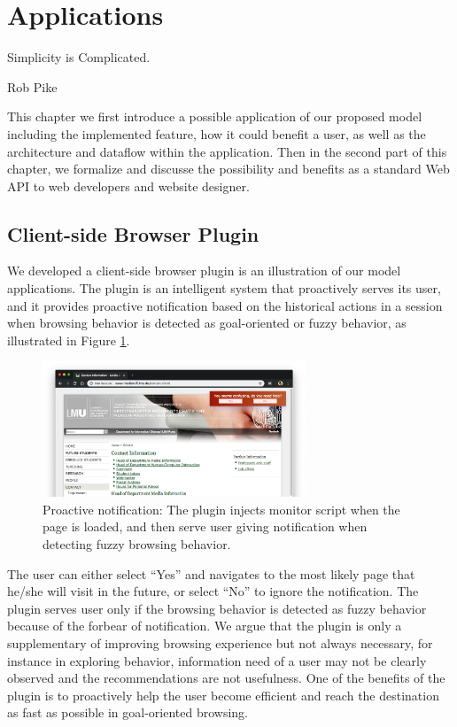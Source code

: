 \section{Applications}
\label{ch:app}

\epigraph{Simplicity is Complicated.}{Rob Pike}

This chapter we first introduce a possible application of our proposed model
including the implemented feature, how it could benefit a user, as well as the 
architecture and dataflow within the application.
Then in the second part of this chapter, we formalize and discusse 
the possibility and benefits as a standard Web API to web developers and website designer.

\subsection{Client-side Browser Plugin}
\label{sec:plugin}

We developed a client-side browser plugin is an illustration of our model applications.
The plugin is an intelligent system that proactively serves its user, 
and it provides proactive notification based on the historical actions in a session
when browsing behavior is detected as goal-oriented or fuzzy behavior, 
as illustrated in Figure \ref{fig:proactive-noti}.

\begin{figure}[H]
    \centering
    \includegraphics[width=0.7\textwidth]{figures/proactive-noti}
    \caption{Proactive notification:
    The plugin injects monitor script when the page is loaded, and then serve user giving
    notification when detecting fuzzy browsing behavior.}
    \label{fig:proactive-noti}
\end{figure}

The user can either select ``Yes'' and navigates to the most likely page that he/she will visit
in the future, or select ``No'' to ignore the notification.
The plugin serves user only if the browsing behavior is detected as fuzzy behavior because
of the forbear of notification. We argue that the plugin is only a supplementary of improving
browsing experience but not always necessary, for instance in exploring behavior, information
need of a user may not be clearly observed and the recommendations are not usefulness. 
One of the benefits of the plugin is to proactively help the user become efficient
and reach the destination as fast as possible in goal-oriented browsing.

